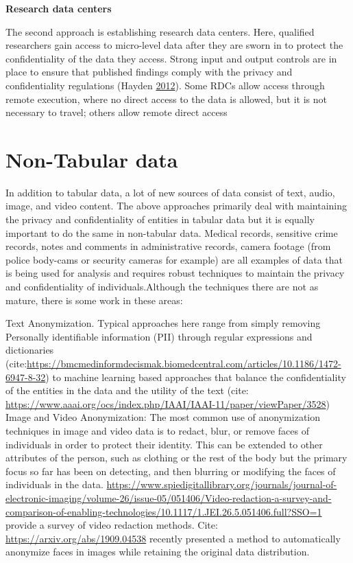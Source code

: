 \documentclass[]{krantz}
\begin{document}
\textbf{Research data centers}

The second approach is establishing research data centers. Here,
qualified researchers gain access to micro-level data after they are
sworn in to protect the confidentiality of the data they access. Strong
input and output controls are in place to ensure that published findings
comply with the privacy and confidentiality regulations (Hayden
\protect\hyperlink{ref-hayden2012broken}{2012}). Some RDCs allow access
through remote execution, where no direct access to the data is allowed,
but it is not necessary to travel; others allow remote direct access

\section{Non-Tabular data}\label{non-tabular-data}

In addition to tabular data, a lot of new sources of data consist of
text, audio, image, and video content. The above approaches primarily
deal with maintaining the privacy and confidentiality of entities in
tabular data but it is equally important to do the same in non-tabular
data. Medical records, sensitive crime records, notes and comments in
administrative records, camera footage (from police body-cams or
security cameras for example) are all examples of data that is being
used for analysis and requires robust techniques to maintain the privacy
and confidentiality of individuals.Although the techniques there are not
as mature, there is some work in these areas:

Text Anonymization. Typical approaches here range from simply removing
Personally identifiable information (PII) through regular expressions
and dictionaries
(cite:\url{https://bmcmedinformdecismak.biomedcentral.com/articles/10.1186/1472-6947-8-32})
to machine learning based approaches that balance the confidentiality of
the entities in the data and the utility of the text (cite:
\url{https://www.aaai.org/ocs/index.php/IAAI/IAAI-11/paper/viewPaper/3528})
Image and Video Anonymization: The most common use of anonymization
techniques in image and video data is to redact, blur, or remove faces
of individuals in order to protect their identity. This can be extended
to other attributes of the person, such as clothing or the rest of the
body but the primary focus so far has been on detecting, and then
blurring or modifying the faces of individuals in the data.
\url{https://www.spiedigitallibrary.org/journals/journal-of-electronic-imaging/volume-26/issue-05/051406/Video-redaction-a-survey-and-comparison-of-enabling-technologies/10.1117/1.JEI.26.5.051406.full?SSO=1}
provide a survey of video redaction methods. Cite:
\url{https://arxiv.org/abs/1909.04538} recently presented a method to
automatically anonymize faces in images while retaining the original
data distribution.
\end{document}
